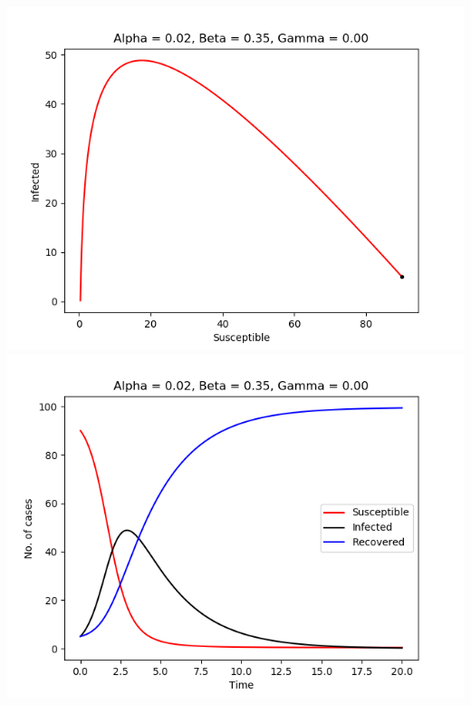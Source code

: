 \begin{frame}
\includegraphics[scale=0.295]{fig/img/a2_b35_g0.png}
\includegraphics[scale=0.295]{fig/img/t_a2_b35_g0.png}
%
\end{frame}
%
